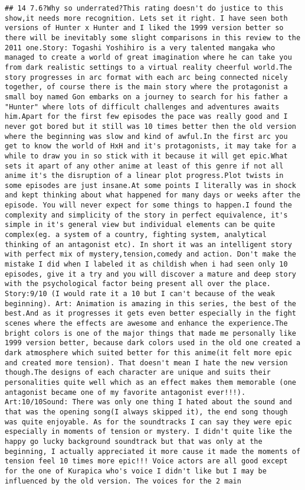 \documentclass[
]{article}
\begin{document}
\begin{verbatim}
## 14 7.6?Why so underrated?This rating doesn't do justice to this show,it needs more recognition. Lets set it right. I have seen both versions of Hunter x Hunter and I liked the 1999 version better so there will be inevitably some slight comparisons in this review to the 2011 one.Story: Togashi Yoshihiro is a very talented mangaka who managed to create a world of great imagination where he can take you from dark realistic settings to a virtual reality cheerful world.The story progresses in arc format with each arc being connected nicely together, of course there is the main story where the protagonist a small boy named Gon embarks on a journey to search for his father a "Hunter" where lots of difficult challenges and adventures awaits him.Apart for the first few episodes the pace was really good and I never got bored but it still was 10 times better then the old version where the beginning was slow and kind of awful.In the first arc you get to know the world of HxH and it's protagonists, it may take for a while to draw you in so stick with it because it will get epic.What sets it apart of any other anime at least of this genre if not all anime it's the disruption of a linear plot progress.Plot twists in some episodes are just insane.At some points I literally was in shock and kept thinking about what happened for many days or weeks after the episode. You will never expect for some things to happen.I found the complexity and simplicity of the story in perfect equivalence, it's simple in it's general view but individual elements can be quite complex(eg. a system of a country, fighting system, analytical thinking of an antagonist etc). In short it was an intelligent story with perfect mix of mystery,tension,comedy and action. Don't make the mistake I did when I labeled it as childish when i had seen only 10 episodes, give it a try and you will discover a mature and deep story with the psychological factor being present all over the place. Story:9/10 (I would rate it a 10 but I can't because of the weak beginning). Art: Animation is amazing in this series, the best of the best.And as it progresses it gets even better especially in the fight scenes where the effects are awesome and enhance the experience.The bright colors is one of the major things that made me personally like 1999 version better, because dark colors used in the old one created a dark atmosphere which suited better for this anime(it felt more epic and created more tension). That doesn't mean I hate the new version though.The designs of each character are unique and suits their personalities quite well which as an effect makes them memorable (one antagonist became one of my favorite antagonist ever!!!). Art:10/10Sound: There was only one thing I hated about the sound and that was the opening song(I always skipped it), the end song though was quite enjoyable. As for the soundtracks I can say they were epic especially in moments of tension or mystery. I didn't quite like the happy go lucky background soundtrack but that was only at the beginning, I actually appreciated it more cause it made the moments of tension feel 10 times more epic!!! Voice actors are all good except for the one of Kurapica who's voice I didn't like but I may be influenced by the old version. The voices for the 2 main 
\end{verbatim}
\end{document}
